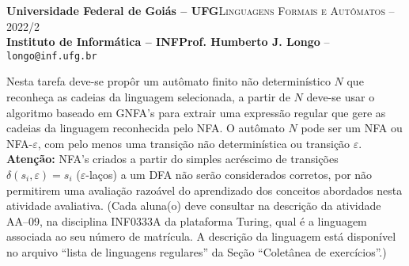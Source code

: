 \documentclass[12pt]{article}
\def\ua{09}
\begin{document}
 \begin{tcolorbox}[rounded corners, colback=blue!3, colframe=blue!40!black]
  \footnotesize\textbf{Universidade Federal de Goiás -- UFG}\hfill \textsc{Linguagens Formais e Autômatos -- 2022/2}\\
  \footnotesize\textbf{Instituto de Informática -- INF\hfill Prof. Humberto J. Longo} -- \scriptsize\texttt{longo@inf.ufg.br}
 \end{tcolorbox}\bigskip
%
\begin{tcolorbox}[rounded corners, colback=blue!2, colframe=blue!40!black, title=\textbf{Atividade AA-\ua}]
  Nesta tarefa deve-se propôr um autômato finito não determinístico $N$ que reconheça as cadeias da linguagem selecionada, a partir de $N$ deve-se usar o algoritmo baseado em GNFA's para extrair uma expressão regular que gere as cadeias da linguagem reconhecida pelo NFA. O autômato $N$ pode ser um NFA ou NFA-$\varepsilon$, com pelo menos uma transição não determinística ou transição $\varepsilon$. \textbf{Atenção:} NFA's criados a partir do simples acréscimo de transições $\delta(s_i,\varepsilon)=s_i$ ($\varepsilon$-laços) a um DFA não serão considerados corretos, por não permitirem uma avaliação razoável do aprendizado dos conceitos abordados nesta atividade avaliativa. (Cada aluna(o) deve consultar na descrição da atividade AA--\ua, na disciplina INF0333A da plataforma Turing, qual é a linguagem associada ao seu número de matrícula. A descrição da linguagem está disponível no arquivo ``lista de linguagens regulares'' da Seção ``Coletânea de exercícios''.)
\end{tcolorbox}\bigskip
\end{document}
